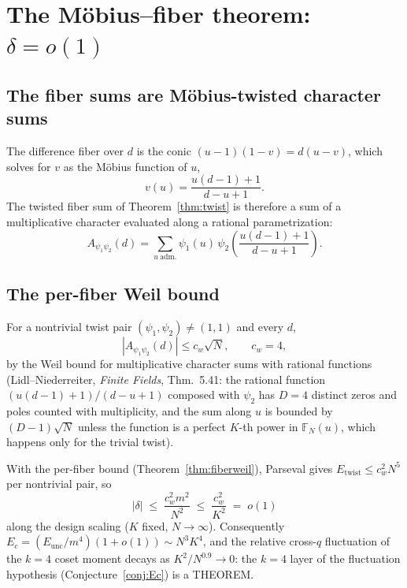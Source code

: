 
\section{The M\"obius--fiber theorem: $\delta = o(1)$}
\label{sec:r101}

\subsection{The fiber sums are M\"obius-twisted character sums}

The difference fiber over $d$ is the conic
$(u{-}1)(1{-}v) = d(u{-}v)$, which solves for $v$ as the M\"obius
function of $u$,
\[
  v(u) = \frac{u(d-1)+1}{\,d-u+1\,}.
\]
The twisted fiber sum of Theorem~\ref{thm:twist} is therefore a sum of
a multiplicative character evaluated along a rational parametrization:
\[
  A_{\psi_1\psi_2}(d) = \sum_{u \ \mathrm{adm.}} \psi_1(u)\,
  \psi_2\!\left(\frac{u(d-1)+1}{d-u+1}\right).
\]

\subsection{The per-fiber Weil bound}

\begin{theorem}
\label{thm:fiberweil}
For a nontrivial twist pair $(\psi_1,\psi_2) \neq (1,1)$ and every $d$,
\[
  |A_{\psi_1\psi_2}(d)| \le c_w \sqrt{N}, \qquad c_w = 4,
\]
by the Weil bound for multiplicative character sums with rational
functions (Lidl--Niederreiter, \emph{Finite Fields}, Thm.~5.41: the
rational function $(u(d{-}1)+1)/(d{-}u+1)$ composed with $\psi_2$ has
$D = 4$ distinct zeros and poles counted with multiplicity, and the
sum along $u$ is bounded by $(D-1)\sqrt{N}$ unless the function is a
perfect $K$-th power in $\mathbb{F}_N(u)$, which happens only for the
trivial twist).
\end{theorem}

\begin{theorem}
\label{thm:deltabound}
With the per-fiber bound (Theorem~\ref{thm:fiberweil}), Parseval gives
$E_{\mathrm{twist}} \le c_w^2 N^5$ per nontrivial pair, so
\[
  |\delta| \;\le\; \frac{c_w^2 m^2}{N^2} \;\le\; \frac{c_w^2}{K^2}
  \;=\; o(1)
\]
along the design scaling ($K$ fixed, $N \to \infty$).  Consequently
$E_c = (E_{\mathrm{unc}}/m^4)(1 + o(1)) \sim N^3 K^4$, and the
relative cross-$q$ fluctuation of the $k{=}4$ coset moment decays as
$K^2/N^{0.9} \to 0$: the $k{=}4$ layer of the fluctuation hypothesis
(Conjecture~\ref{conj:Ec}) is a THEOREM.
\end{theorem}

